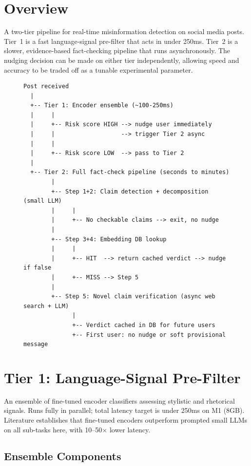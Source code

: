 \section{Overview}

A two-tier pipeline for real-time misinformation detection on social media posts.
Tier~1 is a fast language-signal pre-filter that acts in under 250ms.
Tier~2 is a slower, evidence-based fact-checking pipeline that runs asynchronously.
The nudging decision can be made on either tier independently, allowing speed and accuracy to be traded off as a tunable experimental parameter.

\begin{figure}[h]
\centering
\begin{verbatim}
Post received
  |
  +-- Tier 1: Encoder ensemble (~100-250ms)
  |     |
  |     +-- Risk score HIGH --> nudge user immediately
  |     |                   --> trigger Tier 2 async
  |     |
  |     +-- Risk score LOW  --> pass to Tier 2
  |
  +-- Tier 2: Full fact-check pipeline (seconds to minutes)
        |
        +-- Step 1+2: Claim detection + decomposition (small LLM)
        |     |
        |     +-- No checkable claims --> exit, no nudge
        |
        +-- Step 3+4: Embedding DB lookup
        |     |
        |     +-- HIT  --> return cached verdict --> nudge if false
        |     +-- MISS --> Step 5
        |
        +-- Step 5: Novel claim verification (async web search + LLM)
              |
              +-- Verdict cached in DB for future users
              +-- First user: no nudge or soft provisional message
\end{verbatim}
\end{figure}

\section{Tier 1: Language-Signal Pre-Filter}

An ensemble of fine-tuned encoder classifiers assessing stylistic and rhetorical signals.
Runs fully in parallel; total latency target is under 250ms on M1 (8GB).
Literature establishes that fine-tuned encoders outperform prompted small LLMs on all sub-tasks here, with 10--50$\times$ lower latency.

\subsection{Ensemble Components}

